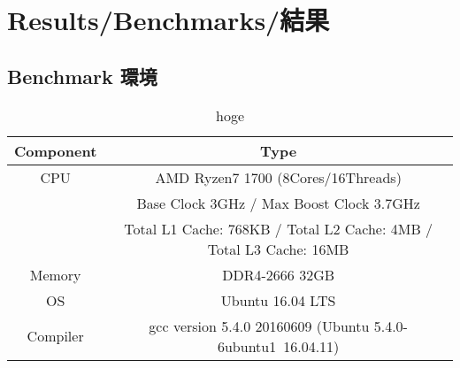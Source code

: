 \chapter{Results/Benchmarks/結果}
\label{chap_Results}

\section{Benchmark 環境}

\begin{table}[hbtp]
  \begin{center}
    \caption{hoge}
    \begin{tabular}{cc} \hline
      Component & Type \rule[0pt]{0pt}{0pt} \\ \hline
      CPU & AMD Ryzen7 1700 (8Cores/16Threads) \rule[0pt]{0pt}{0pt} \\ 
      & Base Clock 3GHz / Max Boost Clock 3.7GHz \rule[0pt]{0pt}{0pt} \\
      & Total L1 Cache: 768KB / Total L2 Cache: 4MB / Total L3 Cache: 16MB \\
      Memory & DDR4-2666 32GB \rule[0pt]{0pt}{0pt} \\
      OS & Ubuntu 16.04 LTS \rule[0pt]{0pt}{0pt} \\
      Compiler & gcc version 5.4.0 20160609 (Ubuntu 5.4.0-6ubuntu1~16.04.11) \rule[0pt]{0pt}{0pt} \\ \hline
    \end{tabular}
  \end{center}
  \label{tb:arrst}
\end{table}


